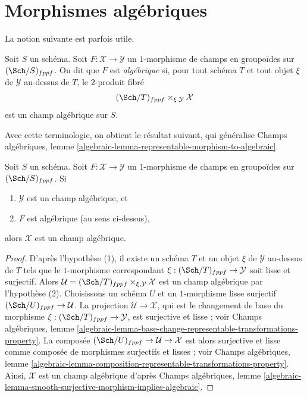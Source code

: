 \section{Morphismes algébriques}
\label{section-algebraic}

\noindent
La notion suivante est parfois utile.

\begin{definition}
\label{definition-algebraic}
Soit $S$ un schéma. Soit $F : \mathcal{X} \to \mathcal{Y}$ un
$1$-morphisme de champs en groupoïdes sur $(\Sch/S)_{fppf}$.
On dit que $F$ est {\it algébrique} si, pour tout schéma $T$ et tout
objet $\xi$ de $\mathcal{Y}$ au-dessus de $T$, le $2$-produit fibré
$$
(\Sch/T)_{fppf} \times_{\xi, \mathcal{Y}} \mathcal{X}
$$
est un champ algébrique sur $S$.
\end{definition}

\noindent
Avec cette terminologie, on obtient le résultat suivant, qui généralise
Champs algébriques, lemme
\ref{algebraic-lemma-representable-morphism-to-algebraic}.

\begin{lemma}
\label{lemma-algebraic-morphism-to-algebraic}
Soit $S$ un schéma.
Soit $F : \mathcal{X} \to \mathcal{Y}$ un $1$-morphisme de
champs en groupoïdes sur $(\Sch/S)_{fppf}$. Si
\begin{enumerate}
\item $\mathcal{Y}$ est un champ algébrique, et
\item $F$ est algébrique (au sens ci-dessus),
\end{enumerate}
alors $\mathcal{X}$ est un champ algébrique.
\end{lemma}

\begin{proof}
D'après l'hypothèse (1), il existe un schéma $T$ et un objet
$\xi$ de $\mathcal{Y}$ au-dessus de $T$ tels que le
$1$-morphisme correspondant $\xi : (\Sch/T)_{fppf} \to \mathcal{Y}$
soit lisse et surjectif. Alors
$\mathcal{U} = (\Sch/T)_{fppf} \times_{\xi, \mathcal{Y}} \mathcal{X}$
est un champ algébrique par l'hypothèse (2).
Choisissons un schéma $U$ et un $1$-morphisme lisse surjectif
$(\Sch/U)_{fppf} \to \mathcal{U}$.
La projection $\mathcal{U} \longrightarrow \mathcal{X}$,
qui est le changement de base du morphisme
$\xi : (\Sch/T)_{fppf} \to \mathcal{Y}$,
est surjective et lisse ; voir
Champs algébriques, lemme
\ref{algebraic-lemma-base-change-representable-transformations-property}.
La composée
$(\Sch/U)_{fppf} \to \mathcal{U} \to \mathcal{X}$
est alors surjective et lisse comme composée de
morphismes surjectifs et lisses ; voir
Champs algébriques, lemme
\ref{algebraic-lemma-composition-representable-transformations-property}.
Ainsi, $\mathcal{X}$ est un champ algébrique d'après
Champs algébriques, lemme
\ref{algebraic-lemma-smooth-surjective-morphism-implies-algebraic}.
\end{proof}

